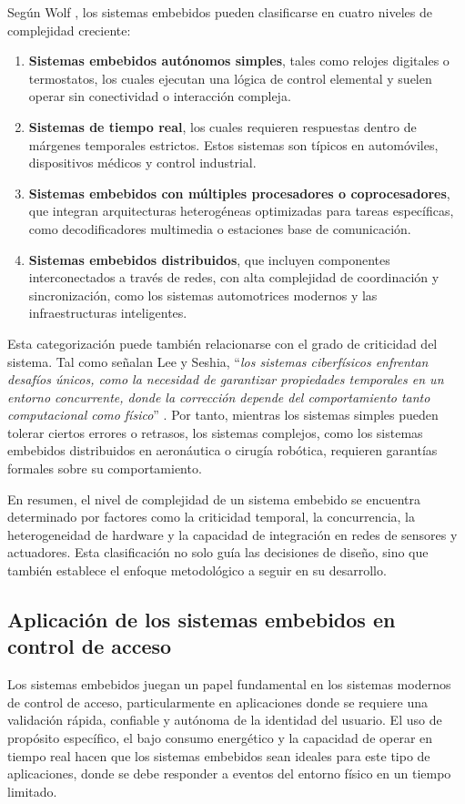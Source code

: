 Según Wolf \cite{wolf_embedded_2012}, los sistemas embebidos pueden clasificarse en cuatro niveles de complejidad creciente: 
\begin{enumerate} 
    \item \textbf{Sistemas embebidos autónomos simples}, tales como relojes digitales o termostatos, los cuales ejecutan una lógica de control elemental y suelen operar sin conectividad o interacción compleja.
    \item \textbf{Sistemas de tiempo real}, los cuales requieren respuestas dentro de márgenes temporales estrictos. Estos sistemas son típicos en automóviles, dispositivos médicos y control industrial.
    \item \textbf{Sistemas embebidos con múltiples procesadores o coprocesadores}, que integran arquitecturas heterogéneas optimizadas para tareas específicas, como decodificadores multimedia o estaciones base de comunicación.
    \item \textbf{Sistemas embebidos distribuidos}, que incluyen componentes interconectados a través de redes, con alta complejidad de coordinación y sincronización, como los sistemas automotrices modernos y las infraestructuras inteligentes.
\end{enumerate}

Esta categorización puede también relacionarse con el grado de criticidad del sistema. Tal como señalan Lee y Seshia, ``\textit{los sistemas ciberfísicos enfrentan desafíos únicos, como la necesidad de garantizar propiedades temporales en un entorno concurrente, donde la corrección depende del comportamiento tanto computacional como físico}'' \cite{lee_introduction_2017}. Por tanto, mientras los sistemas simples pueden tolerar ciertos errores o retrasos, los sistemas complejos, como los sistemas embebidos distribuidos en aeronáutica o cirugía robótica, requieren garantías formales sobre su comportamiento.

En resumen, el nivel de complejidad de un sistema embebido se encuentra determinado por factores como la criticidad temporal, la concurrencia, la heterogeneidad de hardware y la capacidad de integración en redes de sensores y actuadores. Esta clasificación no solo guía las decisiones de diseño, sino que también establece el enfoque metodológico a seguir en su desarrollo.

\subsection{Aplicación de los sistemas embebidos en control de acceso}
Los sistemas embebidos juegan un papel fundamental en los sistemas modernos de control de acceso, particularmente en aplicaciones donde se requiere una validación rápida, confiable y autónoma de la identidad del usuario. El uso de propósito específico, el bajo consumo energético y la capacidad de operar en tiempo real hacen que los sistemas embebidos sean ideales para este tipo de aplicaciones, donde se debe responder a eventos del entorno físico en un tiempo limitado.

